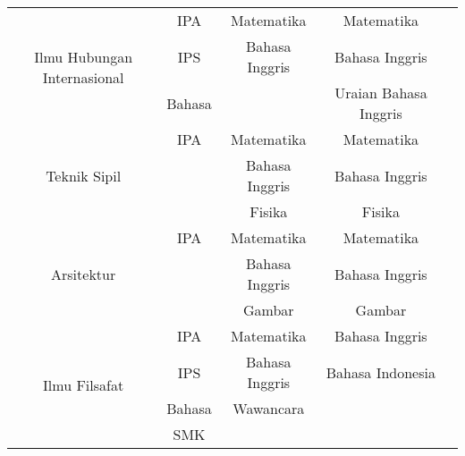 \begin{table}[H]
\begin{tabular}{| c | c | c | c | c |}
		\hline
		\multirow{3}{10em}{Ilmu Hubungan Internasional} & IPA & Matematika & Matematika & \\
		& IPS & Bahasa Inggris & Bahasa Inggris & \\
		& Bahasa & & Uraian Bahasa Inggris & \\
		
		\hline
		\multirow{3}{10em}{Teknik Sipil} & IPA & Matematika & Matematika & \\
		& & Bahasa Inggris & Bahasa Inggris & \\
		& & Fisika & Fisika & \\
		
		\hline
		\multirow{3}{10em}{Arsitektur} & IPA & Matematika & Matematika & \\
		& & Bahasa Inggris & Bahasa Inggris & \\
		& & Gambar & Gambar & \\
		
		\hline
		\multirow{4}{10em}{Ilmu Filsafat} & IPA & Matematika & Bahasa Inggris & \\
		& IPS & Bahasa Inggris & Bahasa Indonesia & \\
		& Bahasa & Wawancara & & \\
		& SMK & & & \\
		
		\hline
	\end{tabular} 
\end{table}


